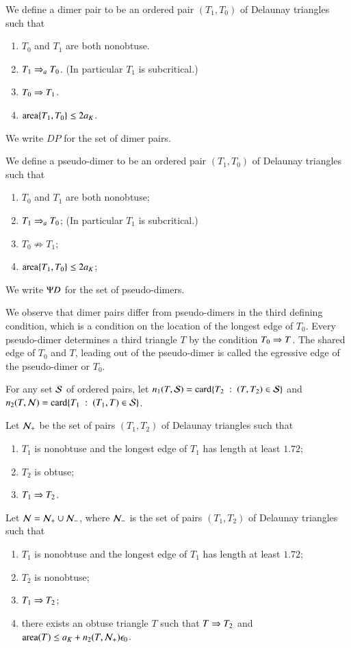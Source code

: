 \begin{definition}
We define a dimer pair to be an ordered pair $(T_1,T_0)$ of Delaunay triangles
such that 
\begin{enumerate}
\item $T_0$ and $T_1$ are both nonobtuse.
\item $T_1\ra{a} T_0$.  (In particular $T_1$ is subcritical.)
\item $T_0 \Ra T_1$.
\item $\area\{T_1,T_0\} \le 2\aK$.
\end{enumerate}
We write $DP$ for the set of dimer pairs.
\end{definition}

\begin{definition}
We define a pseudo-dimer to be an ordered pair $(T_1,T_0)$ of Delaunay triangles
such that
\begin{enumerate}
\item $T_0$ and $T_1$ are both nonobtuse;
\item $T_1\ra{a} T_0$;  (In particular $T_1$ is subcritical.)
\item $T_0 \nRightarrow T_1$;
\item $\area\{T_1,T_0\} \le 2\aK$;
\end{enumerate}
We write $\PD$ for the set of pseudo-dimers.
\end{definition}

We observe that dimer pairs differ from pseudo-dimers in the third defining condition, which is a condition
on the location of the longest edge of $T_0$.   Every pseudo-dimer determines a third triangle $T$ by
the condition $T_0\Ra T$.  The shared edge of $T_0$ and $T$, leading out of the pseudo-dimer
is called the egressive edge of the pseudo-dimer or $T_0$.


For any  set $\S$ of ordered pairs, let  $n_1(T,\S) 
= \card \{T_2\mid (T,T_2)\in \S\}$ and $n_2(T,\N) = \card \{T_1\mid
(T_1,T)\in \S\}$. 

Let $\N_+$ be the set of pairs $(T_1,T_2)$ of Delaunay triangles such that
\begin{enumerate}
\item $T_1$ is nonobtuse and the longest edge of $T_1$ has length at least $1.72$;
\item $T_2$ is obtuse;
\item $T_1\Ra T_2$.
\end{enumerate}

Let $\N = \N_+ \cup \N_-$, where $\N_-$ is the set of pairs $(T_1,T_2)$ of Delaunay triangles such that
\begin{enumerate}
\item $T_1$ is nonobtuse and the longest edge of $T_1$ has length at least $1.72$;
\item $T_2$ is nonobtuse;
\item $T_1\Ra T_2$;
\item there exists an obtuse triangle $T$ such that $T\Ra T_2$ and 
$\area(T) \le \aK+  n_2(T,\N_+)\epso$.
\end{enumerate}

